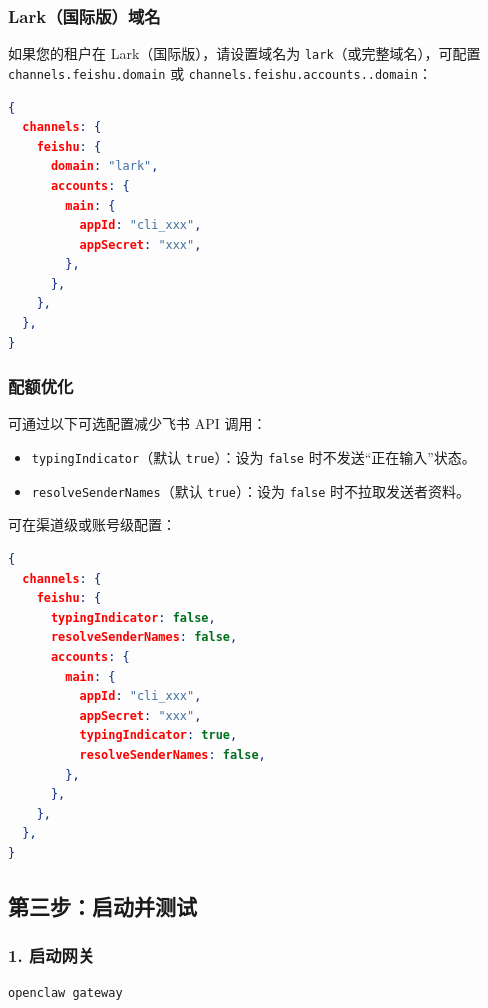 \subsubsection{Lark（国际版）域名}


如果您的租户在 Lark（国际版），请设置域名为 \texttt{lark}（或完整域名），可配置 \texttt{channels.feishu.domain} 或 \texttt{channels.feishu.accounts..domain}：

\begin{lstlisting}[language=json]
{
  channels: {
    feishu: {
      domain: "lark",
      accounts: {
        main: {
          appId: "cli_xxx",
          appSecret: "xxx",
        },
      },
    },
  },
}
\end{lstlisting}


\subsubsection{配额优化}


可通过以下可选配置减少飞书 API 调用：

\begin{itemize}
  \item \texttt{typingIndicator}（默认 \texttt{true}）：设为 \texttt{false} 时不发送“正在输入”状态。
  \item \texttt{resolveSenderNames}（默认 \texttt{true}）：设为 \texttt{false} 时不拉取发送者资料。
\end{itemize}


可在渠道级或账号级配置：

\begin{lstlisting}[language=json]
{
  channels: {
    feishu: {
      typingIndicator: false,
      resolveSenderNames: false,
      accounts: {
        main: {
          appId: "cli_xxx",
          appSecret: "xxx",
          typingIndicator: true,
          resolveSenderNames: false,
        },
      },
    },
  },
}
\end{lstlisting}


\hrulefill


\subsection{第三步：启动并测试}


\subsubsection{1. 启动网关}


\begin{lstlisting}[language=bash]
openclaw gateway
\end{lstlisting}


